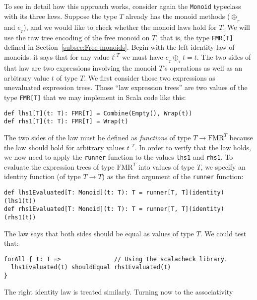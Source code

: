 To see in detail how this approach works, consider again the \lstinline!Monoid!
typeclass with its three laws. Suppose the type $T$ already has the
monoid methods ($\oplus_{_{T}}$ and $e_{_{T}}$), and we would like
to check whether the monoid laws hold for $T$. We will use the raw
tree encoding of the free monoid on $T$, that is, the type \lstinline!FMR[T]!
defined in Section~\ref{subsec:Free-monoids}. Begin with the left
identity law of monoids: it says that for any value $t^{:T}$ we must
have $e_{_{T}}\oplus_{_{T}}t=t$. The two sides of that law are two
expressions involving the monoid $T$\textsf{'}s operations as well as an arbitrary
value $t$ of type $T$. We first consider those two expressions as
unevaluated expression trees. Those \textsf{``}law expression trees\textsf{''} are
two values of the type \lstinline!FMR[T]!
that we may implement in Scala code like this:
\begin{lstlisting}
def lhs1[T](t: T): FMR[T] = Combine(Empty(), Wrap(t))
def rhs1[T](t: T): FMR[T] = Wrap(t)
\end{lstlisting}
The two sides of the law must be defined as \emph{functions} of type
$T\rightarrow\text{FMR}^{T}$ because the law should hold for arbitrary
values $t^{:T}$. In order to verify that the law holds, we now need
to apply the \lstinline!runner!
function to the values \lstinline!lhs1!
and \lstinline!rhs1!. To
evaluate the expression trees of type $\text{FMR}^{T}$ into values
of type $T$, we specify an identity function (of type $T\rightarrow T$)
as the first argument of the \lstinline!runner!
function:
\begin{lstlisting}
def lhs1Evaluated[T: Monoid](t: T): T = runner[T, T](identity)(lhs1(t))
def rhs1Evaluated[T: Monoid](t: T): T = runner[T, T](identity)(rhs1(t))
\end{lstlisting}
The law says that both sides should be equal as values of type $T$.
We could test that:
\begin{lstlisting}
forAll { t: T =>               // Using the scalacheck library.
  lhs1Evaluated(t) shouldEqual rhs1Evaluated(t)
}
\end{lstlisting}
The right identity law is treated similarly. Turning now to the associativity
